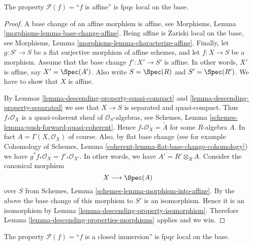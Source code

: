 \begin{lemma}
\label{lemma-descending-property-affine}
The property $\mathcal{P}(f) =$``$f$ is affine''
is fpqc local on the base.
\end{lemma}

\begin{proof}
A base change of an affine morphism is affine, see
Morphisms, Lemma \ref{morphisms-lemma-base-change-affine}.
Being affine is Zariski local on the base, see
Morphisms, Lemma \ref{morphisms-lemma-characterize-affine}.
Finally, let
$g : S' \to S$ be a flat surjective morphism of affine schemes,
and let $f : X \to S$ be a morphism. Assume that the base change
$f' : X' \to S'$ is affine. In other words, $X'$ is affine, say
$X' = \Spec(A')$. Also write $S = \Spec(R)$
and $S' = \Spec(R')$. We have to show that $X$ is affine.

\medskip\noindent
By Lemmas \ref{lemma-descending-property-quasi-compact}
and \ref{lemma-descending-property-separated} we see that
$X \to S$ is separated and quasi-compact. Thus
$f_*\mathcal{O}_X$ is a quasi-coherent sheaf of $\mathcal{O}_S$-algebras,
see Schemes, Lemma \ref{schemes-lemma-push-forward-quasi-coherent}.
Hence $f_*\mathcal{O}_X = \widetilde{A}$ for some $R$-algebra $A$.
In fact $A = \Gamma(X, \mathcal{O}_X)$ of course.
Also, by flat base change
(see for example
Cohomology of Schemes, Lemma \ref{coherent-lemma-flat-base-change-cohomology})
we have $g^*f_*\mathcal{O}_X = f'_*\mathcal{O}_{X'}$.
In other words, we have $A' = R' \otimes_R A$.
Consider the canonical morphism
$$
X \longrightarrow \Spec(A)
$$
over $S$ from Schemes, Lemma \ref{schemes-lemma-morphism-into-affine}.
By the above the base change of this morphism to $S'$ is an isomorphism.
Hence it is an isomorphism by
Lemma \ref{lemma-descending-property-isomorphism}.
Therefore Lemma \ref{lemma-descending-properties-morphisms} applies and we win.
\end{proof}

\begin{lemma}
\label{lemma-descending-property-closed-immersion}
The property $\mathcal{P}(f) =$``$f$ is a closed immersion''
is fpqc local on the base.
\end{lemma}

